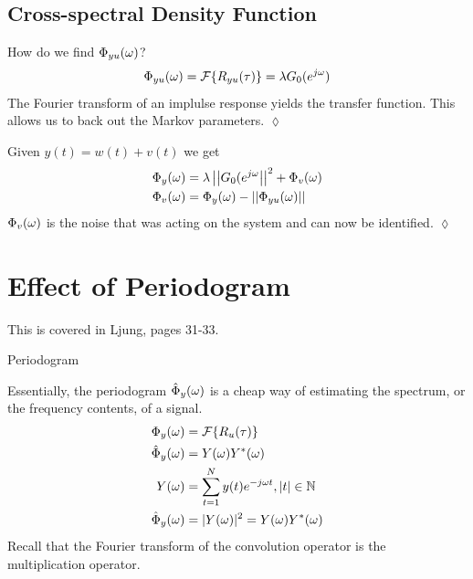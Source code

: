 \subsection{Cross-spectral Density Function}
\begin{example}
How do we find $\Phi_{yu}(\omega)$?
$$\Phi_{yu}(\omega) = \mathcal{F}\{R_{yu}(\tau)\} = \lambda G_0(e^{j\omega})$$
The Fourier transform of an implulse response yields the transfer function. This allows us to back out the Markov parameters.
$\lozenge$
\end{example}

\begin{example}
Given $y(t)=w(t)+v(t)$ we get
\begin{align*}
\Phi_y(\omega) &= \lambda\left|\left|G_0(e^{j\omega}\right|\right|^2 + \Phi_v(\omega) \\
\Phi_v(\omega) &= \Phi_y(\omega) - \left|\left|\Phi_{yu}(\omega)\right|\right|
\end{align*}
$\Phi_v(\omega)$ is the noise that was acting on the system and can now be identified.
$\lozenge$
\end{example}

\section{Effect of Periodogram}
This is covered in Ljung, pages 31-33.
\begin{definition}{Periodogram}

Essentially, the periodogram $\hat{\Phi}_y(\omega)$ is a cheap way of estimating the spectrum, or the frequency contents, of a signal.
\begin{align*}
\Phi_y(\omega) &= \mathcal{F}\{R_u(\tau)\} \\
\hat{\Phi}_y(\omega) &= Y(\omega)Y^\ast(\omega) \\
Y(\omega) &= \sum_{t=1}^Ny(t)e^{-j\omega t}, |t|\in\mathbb{N} \\
\hat{\Phi}_y(\omega) &= |Y(\omega)|^2 = Y(\omega)Y^\ast(\omega)
\end{align*}
Recall that the Fourier transform of the convolution operator is the multiplication operator.
\end{definition}

